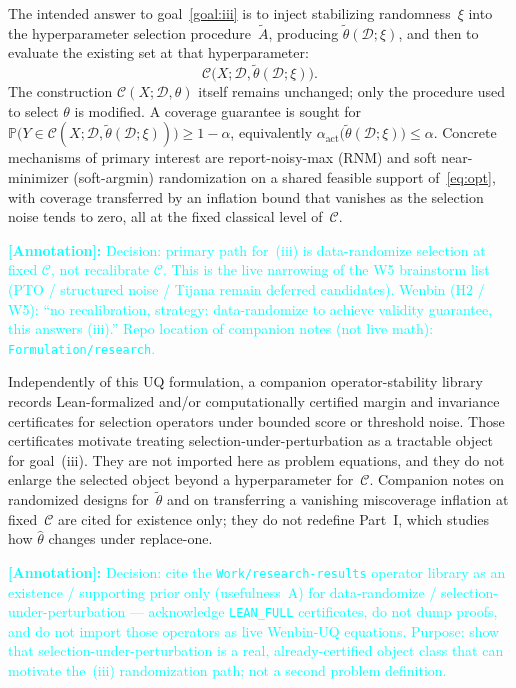 \documentclass[12pt]{article}
\theoremstyle{plain}
\newcommand{\annote}[1]{\textcolor{cyan}{\textbf{[Annotation]:} #1}}
\begin{document}
The intended answer to goal~\ref{goal:iii} is to inject stabilizing randomness~$\xi$ into the hyperparameter selection procedure~$\widetilde A$, producing $\widetilde\theta(\mathcal{D};\xi)$, and then to evaluate the existing set at that hyperparameter:
\[
\mathcal{C}\bigl(X;\mathcal{D},\widetilde\theta(\mathcal{D};\xi)\bigr).
\]
The construction $\mathcal{C}(X;\mathcal{D},\theta)$ itself remains unchanged; only the procedure used to select $\theta$ is modified.
A coverage guarantee is sought for
$\mathbb{P}\bigl(Y\in\mathcal{C}(X;\mathcal{D},\widetilde\theta(\mathcal{D};\xi))\bigr)\ge 1-\alpha$,
equivalently $\alpha_{\mathrm{act}}\bigl(\widetilde\theta(\mathcal{D};\xi)\bigr)\le\alpha$.
Concrete mechanisms of primary interest are report-noisy-max (RNM) and soft near-minimizer (soft-argmin) randomization on a shared feasible support of~\eqref{eq:opt}, with coverage transferred by an inflation bound that vanishes as the selection noise tends to zero, all at the fixed classical level of~$\mathcal{C}$.

\annote{Decision: primary path for~(iii) is data-randomize selection at fixed $\mathcal{C}$, not recalibrate $\mathcal{C}$.
This is the live narrowing of the W5 brainstorm list (PTO / structured noise / Tijana remain deferred candidates).
Wenbin (H2 / W5): ``no recalibration, strategy: data-randomize to achieve validity guarantee, this answers (iii).''
Repo location of companion notes (not live math): \texttt{Formulation/research}.}

Independently of this UQ formulation, a companion operator-stability library records Lean-formalized and/or computationally certified margin and invariance certificates for selection operators under bounded score or threshold noise.
Those certificates motivate treating selection-under-perturbation as a tractable object for goal~(iii).
They are not imported here as problem equations, and they do not enlarge the selected object beyond a hyperparameter for~$\mathcal{C}$.
Companion notes on randomized designs for~$\widetilde\theta$ and on transferring a vanishing miscoverage inflation at fixed~$\mathcal{C}$ are cited for existence only; they do not redefine Part~I, which studies how $\hat\theta$ changes under replace-one.

\annote{Decision: cite the \texttt{Work/research-results} operator library as an existence / supporting prior only (usefulness~A) for data-randomize / selection-under-perturbation --- acknowledge \texttt{LEAN\_FULL} certificates, do not dump proofs, and do not import those operators as live Wenbin-UQ equations.
Purpose: show that selection-under-perturbation is a real, already-certified object class that can motivate the~(iii) randomization path; not a second problem definition.}
\end{document}
